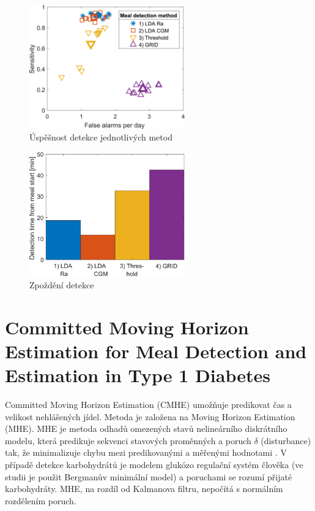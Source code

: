\begin{figure}[H]
\caption{Úspěšnost detekce jednotlivých metod}
\label{fig:lda1}
\centering
\includegraphics[width=0.6\textwidth]{img/analyza/lda1.png}
\end{figure}
\begin{figure}[H]
\caption{Zpoždění detekce}
\label{fig:lda2}
\centering
\includegraphics[width=0.6\textwidth]{img/analyza/lda2.png}
\end{figure}


\section{Committed Moving Horizon Estimation for Meal Detection and Estimation in Type 1 Diabetes \citep{Analyza.MovingHorizon}}
\label{ch:horizon}

Committed Moving Horizon Estimation (CMHE) umožňuje predikovat čas a velikost nehlášených jídel. Metoda je založena na Moving Horizon Estimation (MHE). MHE je metoda odhadů omezených stavů nelineárního diskrátního modelu, která predikuje sekvenci stavových proměnných a poruch $\delta$ (disturbance) tak, že minimalizuje chybu mezi predikovanými a měřenými hodnotami \citep{Analyza.MovingHorizon}. V případě detekce karbohydrátů je modelem glukózo regulační systém člověka (ve studii je použit Bergmanův minimální model) a poruchami se rozumí přijaté karbohydráty. MHE, na rozdíl od Kalmanova filtru, nepočítá s normálním rozdělením poruch. 

